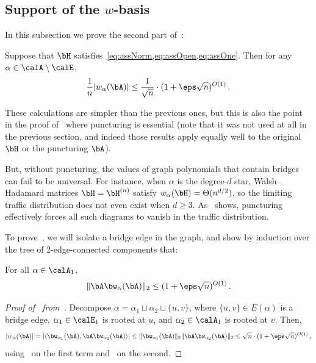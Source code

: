 \subsection{Support of the \texorpdfstring{$w$}{w}-basis}

In this subsection we prove the second part
of~:

\begin{proposition}
    \label{prop:W-support}
    Suppose that $\bH$ satisfies~\cref{eq:assNorm,eq:assOpen,eq:assOne}. Then for any $\alpha\in \calA\setminus \calE$,
    \[
        \frac 1n |w_\alpha(\bA)|\le \frac 1 {\sqrt n} \cdot (1 + \eps \sqrt n)^{O(1)}\,.
    \]
\end{proposition}

These calculations are simpler than the previous ones, but this is also the point in the proof of~ where puncturing is essential (note that it was not used at all in the previous section, and indeed those results apply equally well to the original $\bH$ or the puncturing $\bA$).

But, without puncturing, the values of graph polynomials that contain bridges can fail to be universal.
For instance, when $\alpha$ is the degree-$d$ star,
Walsh--Hadamard matrices $\bH = \bH^{(n)}$ satisfy
$w_\alpha(\bH) = \Theta(n^{d/2})$, so the limiting traffic distribution does not even exist when $d\ge 3$.
As~ shows, puncturing effectively forces all such diagrams to vanish in the traffic distribution.

To prove~, we will isolate a
bridge edge in the graph, and show by induction over the tree of 2-edge-connected components that:

\begin{lemma}
    \label{lem:AW-all}
    For all $\alpha\in \calA_1$,
    \[
       \|\bA \bw_\alpha(\bA)\|_2 \le (1 + \eps \sqrt n)^{O(1)}\,.
    \]
\end{lemma}

\begin{proof}[Proof of~ from~]
    Decompose $\alpha=\alpha_1 \sqcup \alpha_2 \sqcup \{u,v\}$, where $\{u,v\}\in E(\alpha)$ is a bridge edge,
    $\alpha_1\in\calE_1$ is
    rooted at $u$, and
    $\alpha_2\in\calA_1$ is rooted at $v$. Then,
    \[
        |w_\alpha(\bA)| = |\langle \bw_{\alpha_1}(\bA), \bA \bw_{\alpha_2}(\bA)\rangle|\le \|\bw_{\alpha_1}(\bA)\|_2 \|\bA \bw_{\alpha_2}(\bA)\|_2 \le \sqrt n \cdot (1 + \eps \sqrt n)^{O(1)}\,,
    \]
    using~ on
    the first term
    and~ on the second.
\end{proof}

